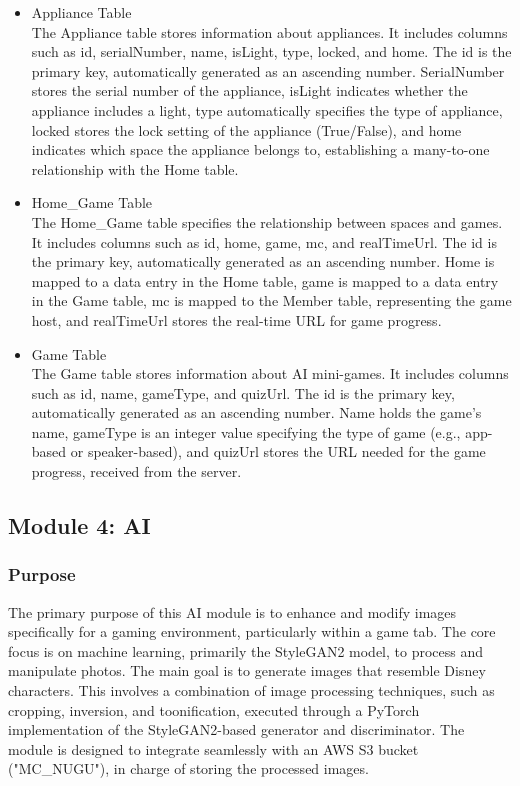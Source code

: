 \documentclass[conference]{IEEEtran}
\begin{document}
\begin{itemize}
                \vspace{3mm}                
                \item Appliance Table\\
                The Appliance table stores information about appliances. It includes columns such as id, serialNumber, name, isLight, type, locked, and home. The id is the primary key, automatically generated as an ascending number. SerialNumber stores the serial number of the appliance, isLight indicates whether the appliance includes a light, type automatically specifies the type of appliance, locked stores the lock setting of the appliance (True/False), and home indicates which space the appliance belongs to, establishing a many-to-one relationship with the Home table.
                \vspace{3mm}                
                \item Home\_Game Table\\
                The Home\_Game table specifies the relationship between spaces and games. It includes columns such as id, home, game, mc, and realTimeUrl. The id is the primary key, automatically generated as an ascending number. Home is mapped to a data entry in the Home table, game is mapped to a data entry in the Game table, mc is mapped to the Member table, representing the game host, and realTimeUrl stores the real-time URL for game progress.
                \vspace{3mm}                
                \item Game Table\\
                The Game table stores information about AI mini-games. It includes columns such as id, name, gameType, and quizUrl. The id is the primary key, automatically generated as an ascending number. Name holds the game's name, gameType is an integer value specifying the type of game (e.g., app-based or speaker-based), and quizUrl stores the URL needed for the game progress, received from the server.
            \end{itemize}
    \subsection{Module 4: AI}
        \subsubsection{Purpose}
            The primary purpose of this AI module is to enhance and modify images specifically for a gaming environment, particularly within a game tab. The core focus is on machine learning, primarily the StyleGAN2 model, to process and manipulate photos. The main goal is to generate images that resemble Disney characters. This involves a combination of image processing techniques, such as cropping, inversion, and toonification, executed through a PyTorch implementation of the StyleGAN2-based generator and discriminator. The module is designed to integrate seamlessly with an AWS S3 bucket ("MC\_NUGU"), in charge of storing the processed images.\\
            \vspace{3mm}
\end{document}
